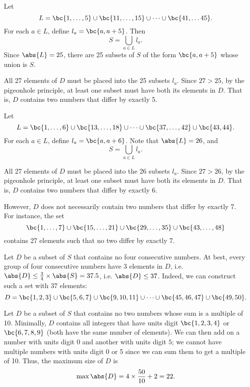 \begin{solution}
    \begin{ppart}
        Let \[L = \bc{1, \dots, 5} \cup \bc{11, \dots, 15} \cup \dots \cup \bc{41, \dots 45}.\] For each $a \in L$, define $l_a = \bc{a, a+5}$. Then \[S = \bigcup_{a \in L} l_a.\] Since $\abs{L} = 25$, there are 25 subsets of $S$ of the form $\bc{a, a+5}$ whose union is $S$.

        All 27 elements of $D$ must be placed into the 25 subsets $l_a$. Since $27 > 25$, by the pigeonhole principle, at least one subset must have both its elements in $D$. That is, $D$ contains two numbers that differ by exactly 5.
    \end{ppart}
    \begin{ppart}
        Let \[L = \bc{1, \dots, 6} \cup \bc{13, \dots, 18} \cup \dots \cup \bc{37, \dots, 42} \cup \bc{43, 44}.\] For each $a \in L$, define $l_a = \bc{a, a+6}$. Note that $\abs{L} = 26$, and \[S = \bigcup_{a \in L} l_a.\]

        All 27 elements of $D$ must be placed into the 26 subsets $l_a$. Since $27 > 26$, by the pigeonhole principle, at least one subset must have both its elements in $D$. That is, $D$ contains two numbers that differ by exactly 6.

        However, $D$ does not necessarily contain two numbers that differ by exactly 7. For instance, the set \[\bc{1, \dots, 7} \cup \bc{15, \dots, 21} \cup \bc{29, \dots, 35} \cup \bc{43, \dots, 48}\] contains 27 elements such that no two differ by exactly 7.
    \end{ppart}
    \begin{ppart}
        Let $D$ be a subset of $S$ that contains no four consecutive numbers. At best, every group of four consecutive numbers have 3 elements in $D$, i.e. $\abs{D} \leq \frac34 \times \abs{S} = 37.5$, i.e. $\abs{D} \leq 37$. Indeed, we can construct such a set with 37 elements: \[D = \bc{1, 2, 3} \cup \bc{5, 6, 7} \cup \bc{9, 10, 11} \cup \dots \cup \bc{45, 46, 47} \cup \bc{49, 50}.\]
    \end{ppart}
    \begin{ppart}
        Let $D$ be a subset of $S$ that contains no two numbers whose sum is a multiple of 10. Minimally, $D$ contains all integers that have units digit $\bc{1, 2, 3, 4}$ or $\bc{6, 7, 8, 9}$ (both have the same number of elements). We can then add on a number with units digit $0$ and another with units digit $5$; we cannot have multiple numbers with units digit 0 or 5 since we can sum them to get a multiple of 10. Thus, the maximum size of $D$ is \[\max \abs{D} = 4 \times \frac{50}{10} + 2 = 22.\]
    \end{ppart}
\end{solution}